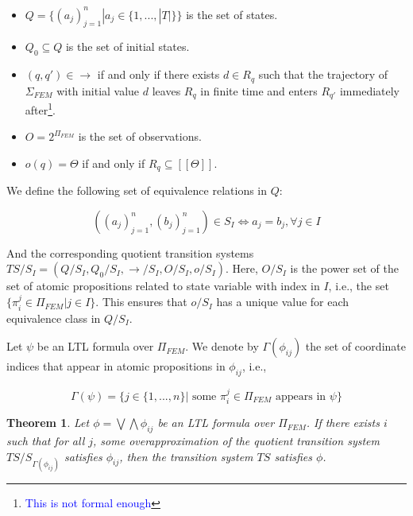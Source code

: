 \documentclass{article}
\newtheorem{theorem}{Theorem}
\newcommand*{\fran}[1]{\textcolor{blue}{#1}}
\begin{document}
\begin{itemize}
    \item $Q = \{(a_j)_{j=1}^n | a_j \in \{1,...,|T|\}\}$ is the set of states.
    \item $Q_0 \subseteq Q$ is the set of initial states.
    \item $(q,q') \in \rightarrow$ if and only if there exists $d \in R_q$ such
        that the trajectory of $\Sigma_{FEM}$ with initial value $d$ leaves
        $R_q$ in finite time and enters $R_{q'}$ immediately
        after\footnote{\fran{This is not formal enough}}.
    \item $O = 2^{\Pi_{FEM}}$ is the set of observations.
    \item $o(q) = \Theta$ if and only if $R_q \subseteq [[\Theta]]$.
\end{itemize}

We define the following set of equivalence relations in $Q$:

\begin{equation}
    ((a_j)_{j=1}^n,(b_j)_{j=1}^n) \in S_I \iff a_j = b_j, \forall j \in I
\end{equation}

And the corresponding quotient transition systems $TS/S_I = (Q/S_I, Q_0/S_I,
\to/S_I, O/S_I, o/S_I)$. Here, $O/S_I$ is the power set of the set of atomic
propositions related to state variable with index in $I$, i.e., the set
$\{\pi_i^j \in \Pi_{FEM} | j \in I \}$. This ensures that $o/S_I$ has a unique
value for each equivalence class in $Q/S_I$.

Let $\psi$ be an LTL formula over $\Pi_{FEM}$. We
denote by $\Gamma(\phi_{ij})$ the set of coordinate indices that appear in
atomic propositions in $\phi_{ij}$, i.e.,

\begin{equation}
    \Gamma(\psi) = \{j \in \{1,...,n\}| \text{ some }\pi_i^j \in \Pi_{FEM} \text{ appears in } \psi\}
\end{equation}


\begin{theorem}

Let $\phi = \bigvee \bigwedge \phi_{ij}$ be an LTL formula over $\Pi_{FEM}$. If
there exists $i$ such that for all $j$, some overapproximation of the quotient transition system
$TS/S_{\Gamma(\phi_{ij})}$ satisfies $\phi_{ij}$, then the transition system $TS$
satisfies $\phi$.
    
\end{theorem}
\end{document}
